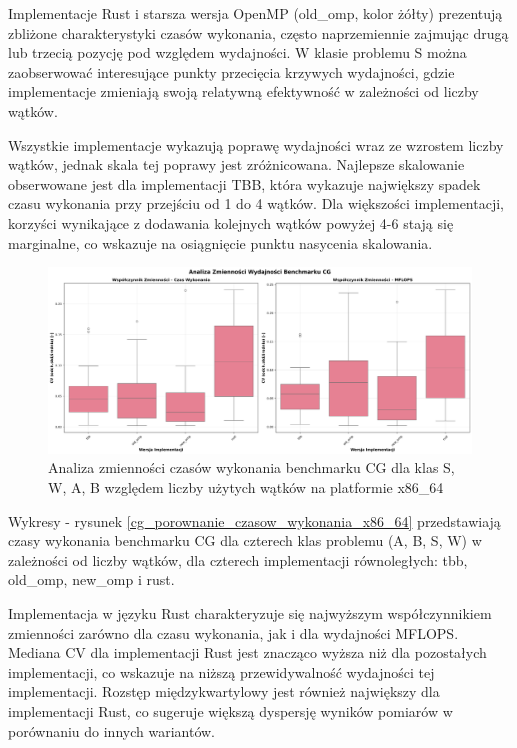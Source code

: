 Implementacje Rust i starsza wersja OpenMP (old\_omp, kolor żółty) prezentują zbliżone charakterystyki czasów wykonania, często naprzemiennie zajmując drugą lub trzecią pozycję pod względem wydajności. W klasie problemu S można zaobserwować interesujące punkty przecięcia krzywych wydajności, gdzie implementacje zmieniają swoją relatywną efektywność w zależności od liczby wątków.

Wszystkie implementacje wykazują poprawę wydajności wraz ze wzrostem liczby wątków, jednak skala tej poprawy jest zróżnicowana. Najlepsze skalowanie obserwowane jest dla implementacji TBB, która wykazuje największy spadek czasu wykonania przy przejściu od 1 do 4 wątków. Dla większości implementacji, korzyści wynikające z dodawania kolejnych wątków powyżej 4-6 stają się marginalne, co wskazuje na osiągnięcie punktu nasycenia skalowania.

\begin{figure}[H]
    \centering
    \includegraphics[width=\textwidth]{analiza/images/parallel/cg/x86/cg_analiza_zmiennosci.png}
    \caption{Analiza zmienności czasów wykonania benchmarku CG dla klas S, W, A, B względem liczby użytych wątków na platformie x86\_64}
    \label{cg_analiza_zmiennosci_x86_64}
\end{figure}
Wykresy - rysunek \ref{cg_porownanie_czasow_wykonania_x86_64} przedstawiają czasy wykonania benchmarku CG dla czterech klas problemu (A, B, S, W) w zależności od liczby wątków, dla czterech implementacji równoległych: tbb, old\_omp, new\_omp i rust.

Implementacja w języku Rust charakteryzuje się najwyższym współczynnikiem zmienności zarówno dla czasu wykonania, jak i dla wydajności MFLOPS. Mediana CV dla implementacji Rust jest znacząco wyższa niż dla pozostałych implementacji, co wskazuje na niższą przewidywalność wydajności tej implementacji. Rozstęp międzykwartylowy jest również największy dla implementacji Rust, co sugeruje większą dyspersję wyników pomiarów w porównaniu do innych wariantów.


